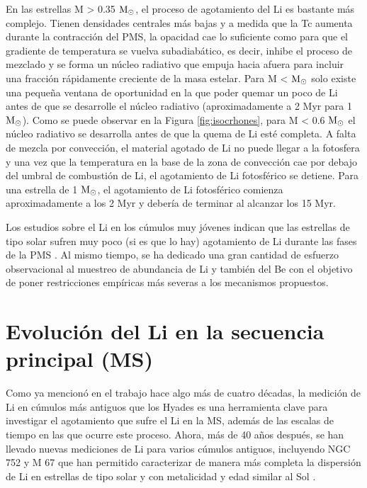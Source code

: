 En las estrellas M > 0.35 $\mathrm{M}_\odot$, el proceso de agotamiento del Li es bastante más complejo. Tienen densidades centrales más bajas y a medida que la Tc aumenta durante la contracción del PMS, la opacidad cae lo suficiente como para que el gradiente de temperatura se vuelva subadiabático, es decir, inhibe el proceso de mezclado y se forma un núcleo radiativo que empuja hacia afuera para incluir una fracción rápidamente creciente de la masa estelar.  Para M <  $\mathrm{M}_\odot$ solo existe una pequeña ventana de oportunidad en la que poder quemar un poco de Li antes de que se desarrolle el núcleo radiativo (aproximadamente a 2 Myr para 1 $\mathrm{M}_\odot$). Como se puede observar en la Figura \ref{fig:isocrhones}, para M < 0.6 $\mathrm{M}_\odot$ el núcleo radiativo se desarrolla antes de que la quema de Li esté completa. A falta de mezcla por convección, el material agotado de Li no puede llegar a la fotosfera y una vez que la temperatura en la base de la zona de convección cae por debajo del umbral de combustión de Li, el agotamiento de Li fotosférico se detiene. Para una estrella de 1 $\mathrm{M}_\odot$, el agotamiento de Li fotosférico comienza aproximadamente a los 2 Myr y debería de terminar al alcanzar los 15 Myr.\par

Los estudios sobre el Li en los cúmulos muy jóvenes indican que las estrellas de tipo solar sufren muy poco (si es que lo hay) agotamiento de Li durante las fases de la PMS  \cite{Jeffries2004}. Al mismo tiempo, se ha dedicado una gran cantidad de esfuerzo observacional al muestreo de abundancia de Li y también del Be \cite{Mena2011, DelgadoMena2014} con el objetivo de poner restricciones empíricas más severas a los mecanismos propuestos.

\section{Evolución del Li en la secuencia principal (MS)}
Como ya mencionó en el trabajo \cite{Zappala1972} hace algo más de cuatro décadas, la medición de Li en cúmulos más antiguos que los Hyades es una herramienta clave para investigar el agotamiento que sufre el Li en la MS, además de las escalas de tiempo en las que ocurre este proceso. Ahora, más de 40 años después, se han llevado nuevas mediciones de Li para varios cúmulos antiguos, incluyendo NGC 752 y M 67 \cite{Sestito2006} que han permitido caracterizar de manera más completa la dispersión de Li en estrellas de tipo solar y con metalicidad y edad similar al Sol \cite{Sestito2005}.\par

